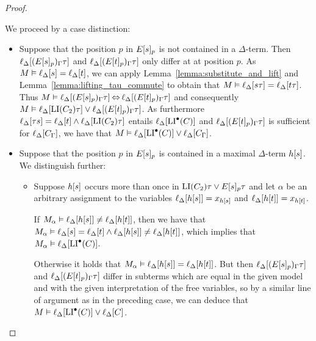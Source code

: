 \begin{proof}
\begin{description}
			We proceed by a case distinction:
			\begin{itemize}
				\item Suppose that the position $p$ in $E{[s]_{p}}$ is not contained in a $\Delta$-term.
					Then
					$\ell_{\Delta}[(E{[s]_{p}})_\Gamma\tau]$
					and
					$\ell_{\Delta}[(E{[t]_{p}})_\Gamma\tau]$
					only differ at at position $p$.
					As $M \vDash \ell_{\Delta}[s] = \ell_{\Delta}[t]$, we can apply Lemma~\ref{lemma:substitute_and_lift} and Lemma~\ref{lemma:lifting_tau_commute} to obtain that 
					$M \vDash \ell_{\Delta}[s\tau] = \ell_{\Delta}[t\tau]$.
					Thus
					$M\vDash \ell_{\Delta}[(E{[s]_{p}})_\Gamma\tau] \operatorname{\Leftrightarrow} 
					\ell_{\Delta}[(E{[t]_{p}})_\Gamma\tau]$
					and consequently
					$M \vDash \ell_{\Delta}[\operatorname{LI}(C_2)\tau] \lor \ell_{\Delta}[(E{[t]_{p}})_\Gamma\tau]$.
					As furthermore $\ell_{\Delta}[\tau s] =\ell_{\Delta}[t] \land \ell_{\Delta}[\operatorname{LI}(C_2)\tau]$ entails $\ell_{\Delta}[\operatorname{LI}^\bullet(C)]$
					and $\ell_{\Delta}[(E{[t]_{p}})_\Gamma\tau]$ is sufficient for $\ell_{\Delta}[C_\Gamma]$,
					we have that 
					$M\vDash \ell_{\Delta}[\operatorname{LI}^\bullet(C)] \lor \ell_{\Delta}[C_\Gamma]$.

				\item
					Suppose that the position $p$ in $E{[s]_{p}}$ is contained in a maximal $\Delta$-term $h[s]$.
					We distinguish further:

					\begin{itemize}
						\item Suppose $h[s]$ occurs more than once in $\operatorname{LI}(C_2)\tau \lor E{[s]_{p}}\tau$ and let $\alpha$ be an arbitrary assignment to the variables $\ell_{\Delta}[h[s]] = x_{h[s]}$ and $\ell_{\Delta}[h[t]] = x_{h[t]}$.

							If $M_\alpha \vDash \ell_{\Delta}[h[s]] \neq \ell_{\Delta}[h[t]]$, then we have that $M_\alpha \entails \lifdeltanovar{s}\nolinebreak=\lifdeltanovar{t} \land\allowbreak \lifdeltanovar{h\occ{s}} \neq \lifdeltanovar{h\occ{t}}$, which implies that $M_\alpha \vDash \ell_{\Delta}[\operatorname{LI}^\bullet(C)]$.

							Otherwise it holds that $M_\alpha \vDash \ell_{\Delta}[h[s]] = \ell_{\Delta}[h[t]]$.
							But then 
							$\ell_{\Delta}[(E{[s]_{p}})_\Gamma\tau]$
							and
							$\ell_{\Delta}[(E{[t]_{p}})_\Gamma\tau]$
							differ in subterms which are equal in the given model and with the given interpretation of the free variables,
							so by a similar line of argument as in the preceding case, we can deduce that $M \vDash \ell_{\Delta}[\operatorname{LI}^\bullet(C)] \lor \ell_{\Delta}[C]$.


\end{itemize}
\end{itemize}
\end{description}
\end{proof}
